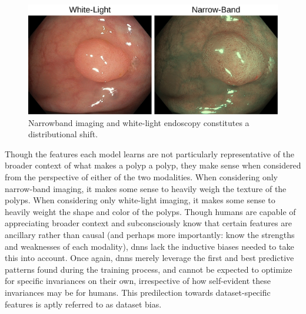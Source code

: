 	\begin{figure}[htb]
		\includegraphics[width=\linewidth]{illustrations/narrow_band.png}
		\caption[NBI v White-light imaging]{Narrowband imaging and white-light endoscopy constitutes a distributional shift.}
	\end{figure}

	Though the features each model learns are not particularly representative of the broader context of what makes a polyp a polyp, they make sense when considered from the perspective of either of the two modalities. When considering only narrow-band imaging, it makes some sense to heavily weigh the texture of the polyps. When considering only white-light imaging, it makes some sense to heavily weight the shape and color of the polyps. Though humans are capable of appreciating broader context and subconsciously know that certain features are ancillary rather than causal (and perhaps more importantly: know the strengths and weaknesses of each modality), \glspl{dnn} lack the inductive biases needed to take this into account. Once again, \glspl{dnn} merely leverage the first and best predictive patterns found during the training process, and cannot be expected to optimize for specific invariances on their own, irrespective of how self-evident these invariances may be for humans. This predilection towards dataset-specific features is aptly referred to as dataset bias. 
	
